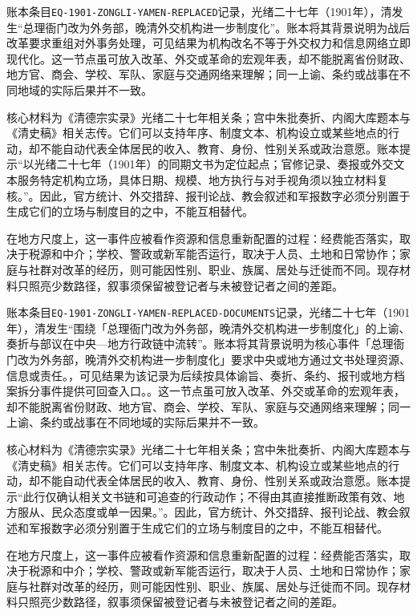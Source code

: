 账本条目\texttt{EQ-1901-ZONGLI-YAMEN-REPLACED}记录，光绪二十七年（1901年），清发生“总理衙门改为外务部，晚清外交机构进一步制度化”。账本将其背景说明为战后改革要求重组对外事务处理，可见结果为机构改名不等于外交权力和信息网络立即现代化。这一节点虽可放入改革、外交或革命的宏观年表，却不能脱离省份财政、地方官、商会、学校、军队、家庭与交通网络来理解；同一上谕、条约或战事在不同地域的实际后果并不一致。

核心材料为《清德宗实录》光绪二十七年相关条；宫中朱批奏折、内阁大库题本与《清史稿》相关志传。它们可以支持年序、制度文本、机构设立或某些地点的行动，却不能自动代表全体居民的收入、教育、身份、性别关系或政治意愿。账本提示“以光绪二十七年（1901年）的同期文书为定位起点；官修记录、奏报或外交文本服务特定机构立场，具体日期、规模、地方执行与对手视角须以独立材料复核。”。因此，官方统计、外交措辞、报刊论战、教会叙述和军报数字必须分别置于生成它们的立场与制度目的之中，不能互相替代。

在地方尺度上，这一事件应被看作资源和信息重新配置的过程：经费能否落实，取决于税源和中介；学校、警政或新军能否运行，取决于人员、土地和日常协作；家庭与社群对改革的经历，则可能因性别、职业、族属、居处与迁徙而不同。现存材料只照亮少数路径，叙事须保留被登记者与未被登记者之间的差距。

账本条目\texttt{EQ-1901-ZONGLI-YAMEN-REPLACED-DOCUMENTS}记录，光绪二十七年（1901年），清发生“围绕「总理衙门改为外务部，晚清外交机构进一步制度化」的上谕、奏折与部议在中央—地方行政链中流转”。账本将其背景说明为核心事件「总理衙门改为外务部，晚清外交机构进一步制度化」要求中央或地方通过文书处理资源、信息或责任。，可见结果为该记录为后续按具体谕旨、奏折、条约、报刊或地方档案拆分事件提供可回查入口。。这一节点虽可放入改革、外交或革命的宏观年表，却不能脱离省份财政、地方官、商会、学校、军队、家庭与交通网络来理解；同一上谕、条约或战事在不同地域的实际后果并不一致。

核心材料为《清德宗实录》光绪二十七年相关条；宫中朱批奏折、内阁大库题本与《清史稿》相关志传。它们可以支持年序、制度文本、机构设立或某些地点的行动，却不能自动代表全体居民的收入、教育、身份、性别关系或政治意愿。账本提示“此行仅确认相关文书链和可追查的行政动作；不得由其直接推断政策有效、地方服从、民众态度或单一因果。”。因此，官方统计、外交措辞、报刊论战、教会叙述和军报数字必须分别置于生成它们的立场与制度目的之中，不能互相替代。

在地方尺度上，这一事件应被看作资源和信息重新配置的过程：经费能否落实，取决于税源和中介；学校、警政或新军能否运行，取决于人员、土地和日常协作；家庭与社群对改革的经历，则可能因性别、职业、族属、居处与迁徙而不同。现存材料只照亮少数路径，叙事须保留被登记者与未被登记者之间的差距。

